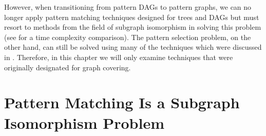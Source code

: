 %

However, when transitioning from \glspl{pattern DAG} to \glspl{pattern graph},
we can no longer apply \gls{pattern matching} techniques designed for
\glspl{tree} and \glspl{DAG} but must resort to methods from the field of
\gls{subgraph isomorphism} in solving this problem (see
 for a time complexity comparison).
%
The
\gls{pattern selection} problem, on the other hand, can still be solved using
many of the techniques which were discussed in
.
%
Therefore, in this chapter we will only examine
techniques that were originally designated for \gls{graph covering}.


\section{Pattern Matching Is a Subgraph Isomorphism Problem}

